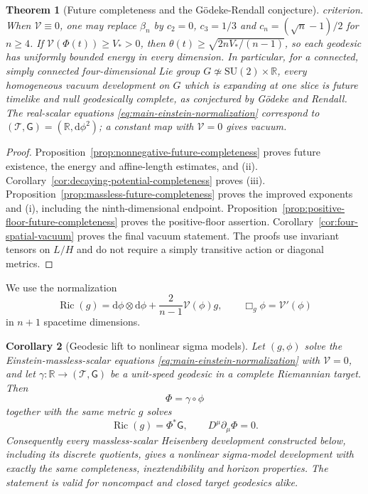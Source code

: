 \documentclass[10pt,a4paper]{article}
\numberwithin{equation}{section}
\newtheorem{theorem}{Theorem}[section]
\newtheorem{corollary}[theorem]{Corollary}
\theoremstyle{definition}
\theoremstyle{remark}
\newcommand{\R}{\mathbb R}
\newcommand{\dd}{\mathrm d}
\newcommand{\Ric}{\operatorname{Ric}}
\begin{document}
\begin{theorem}[Future completeness and the G\"odeke-Rendall conjecture]
criterion.  When $\mathcal V\equiv0$, one may replace $\beta_n$ by
$c_2=0$, $c_3=1/3$ and $c_n=(\sqrt n-1)/2$ for $n\ge4$.
If $\mathcal V(\Phi(t))\ge V_*>0$, then
$\theta(t)\ge\sqrt{2nV_*/(n-1)}$, so each geodesic has uniformly
bounded energy in every dimension.  In particular, for a connected,
simply connected four-dimensional Lie group $G\not\simeq
\mathrm{SU}(2)\times\mathbb R$, every homogeneous vacuum development on
$G$ which is expanding at one slice is future timelike and null
geodesically complete, as conjectured by G\"odeke and Rendall.
The real-scalar equations
\eqref{eq:main-einstein-normalization} correspond to
$(\mathcal T,\mathsf G)=(\R,\dd\phi^2)$; a constant map with
$\mathcal V=0$ gives vacuum.
\end{theorem}

\begin{proof}
Proposition~\ref{prop:nonnegative-future-completeness} proves future
existence, the energy and affine-length estimates, and \textup{(ii)}.
Corollary~\ref{cor:decaying-potential-completeness} proves \textup{(iii)}.
Proposition~\ref{prop:massless-future-completeness} proves the improved
exponents and \textup{(i)}, including the ninth-dimensional endpoint.
Proposition~\ref{prop:positive-floor-future-completeness} proves
the positive-floor assertion.  Corollary~\ref{cor:four-spatial-vacuum}
proves the final vacuum statement.  The proofs use invariant tensors on
$L/H$ and do not require a simply transitive action or diagonal metrics.
\end{proof}

We use the normalization
\begin{equation}
 \Ric(g)=\dd\phi\otimes\dd\phi+
 \frac{2}{n-1}\mathcal V(\phi)g,
 \qquad \Box_g\phi=\mathcal V'(\phi)
 \label{eq:main-einstein-normalization}
\end{equation}
in $n+1$ spacetime dimensions.

\begin{corollary}[Geodesic lift to nonlinear sigma models]
\label{cor:target-geodesic-lift}
Let $(g,\phi)$ solve the Einstein-massless-scalar equations
\eqref{eq:main-einstein-normalization} with $\mathcal V=0$, and let
$\gamma:\mathbb R\to(\mathcal T,\mathsf G)$ be a unit-speed geodesic in
a complete Riemannian target.  Then
\[
 \Phi=\gamma\circ\phi
\]
together with the same metric $g$ solves
\[
 \Ric(g)=\Phi^*\mathsf G,\qquad D^\mu\partial_\mu\Phi=0.
\]
Consequently every massless-scalar Heisenberg development constructed
below, including its discrete quotients, gives a nonlinear sigma-model
development with exactly the same completeness, inextendibility and
horizon properties.  The statement is valid for noncompact and closed
target geodesics alike.
\end{corollary}
\end{document}
